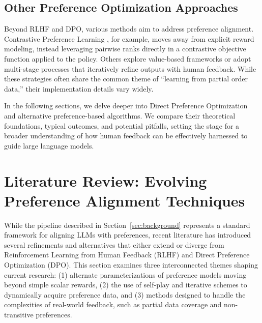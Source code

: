 \documentclass[a4paper,oneside,10pt,ngerman,english]{scrartcl}
\begin{document}
\subsection{Other Preference Optimization Approaches}
Beyond RLHF and DPO, various methods aim to address preference alignment. Contrastive
Preference Learning \cite{bib:Zhao2023}, for example, moves away from explicit
reward modeling, instead leveraging pairwise ranks directly in a contrastive objective function applied to the policy. Others explore
value-based frameworks or adopt multi-stage processes that iteratively refine outputs with
human feedback. While these strategies often share the common theme of “learning from partial
order data,” their implementation details vary widely.

\medskip %
\noindent %
In the following sections, we delve deeper into Direct Preference Optimization and alternative
preference-based algorithms. We compare their theoretical foundations, typical outcomes, and
potential pitfalls, setting the stage for a broader understanding of how human feedback can be
effectively harnessed to guide large language models.

\section{Literature Review: Evolving Preference Alignment Techniques}
\label{sec:litreview}

While the pipeline described in Section~\ref{sec:background} represents a standard framework for
aligning LLMs with preferences, recent literature has introduced several refinements and
alternatives that either extend or diverge from Reinforcement Learning from Human Feedback (RLHF)
and Direct Preference Optimization (DPO). This section examines three interconnected themes shaping
current research: (1) alternate parameterizations of preference models moving beyond simple scalar rewards,
(2) the use of self-play and iterative schemes to dynamically acquire preference data, and
(3) methods designed to handle the complexities of real-world feedback, such as partial data coverage and non-transitive preferences.
\end{document}
